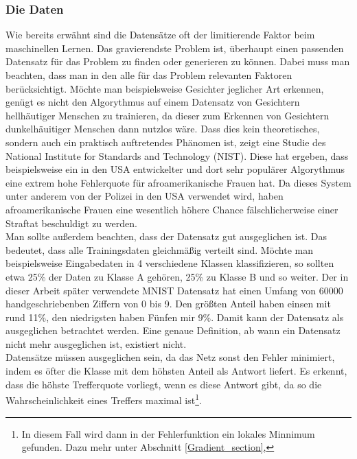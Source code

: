\documentclass{article}
\begin{document}
\subsubsection{Die Daten}
Wie bereits erwähnt sind die Datensätze oft der limitierende Faktor beim maschinellen Lernen. Das gravierendste Problem ist, überhaupt einen passenden Datensatz für das Problem zu finden oder generieren zu können. Dabei muss man beachten, dass man in den alle für das Problem relevanten Faktoren berücksichtigt. Möchte man beispielsweise Gesichter jeglicher Art erkennen, genügt es nicht den Algorythmus auf einem Datensatz von Gesichtern hellhäutiger Menschen zu trainieren, da dieser zum Erkennen von Gesichtern dunkelhäuitiger Menschen dann nutzlos wäre. Dass dies kein theoretisches, sondern auch ein praktisch auftretendes Phänomen ist, zeigt eine Studie des National Institute for Standards and Technology (NIST)\cite{5}. Diese hat ergeben, dass beispielsweise ein in den USA entwickelter und dort sehr populärer Algorythmus eine extrem hohe Fehlerquote für afroamerikanische Frauen hat. Da dieses System unter anderem von der Polizei in den USA verwendet wird, haben afroamerikanische Frauen eine wesentlich höhere Chance fälschlicherweise einer Straftat beschuldigt zu werden.\\
Man sollte außerdem beachten, dass der Datensatz gut ausgeglichen ist. Das bedeutet, dass alle Trainingsdaten gleichmäßig verteilt sind. Möchte man beispielsweise Eingabedaten in 4 verschiedene Klassen klassifizieren, so sollten etwa 25\% der Daten zu Klasse A gehören, 25\% zu Klasse B und so weiter. Der in dieser Arbeit später verwendete MNIST Datensatz hat einen Umfang von 60000 handgeschriebenben Ziffern von 0 bis 9. Den größten Anteil haben einsen mit rund 11\%, den niedrigsten haben Fünfen mir 9\%. Damit kann der Datensatz als ausgeglichen betrachtet werden. Eine genaue Definition, ab wann ein Datensatz nicht mehr ausgeglichen ist, existiert nicht.\\
Datensätze müssen ausgeglichen sein, da das Netz sonst den Fehler minimiert, indem es öfter die Klasse mit dem höhsten Anteil als Antwort liefert. Es erkennt, dass die höhste Trefferquote vorliegt, wenn es diese Antwort gibt, da so die Wahrscheinlichkeit eines Treffers maximal ist\footnote{In diesem Fall wird dann in der Fehlerfunktion ein lokales Minnimum gefunden. Dazu mehr unter Abschnitt \ref{Gradient_section}, }.
\end{document}
